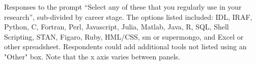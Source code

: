 \label{fig:stack1}

Responses to the prompt ``Select any of these that you regularly use in your research'', sub-divided by career stage.  The options listed included: IDL, IRAF, Python, C, Fortran, Perl, Javascript, Julia, Matlab, Java, R, SQL, Shell Scripting, STAN, Figaro, Ruby, HML/CSS, sm or supermongo, and Excel or other spreadsheet.  Respondents could add additional tools not listed using an "Other" box. Note that the x axis varies between panels.